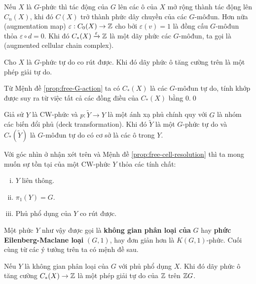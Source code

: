 Nếu $X$ là $G$-phức thì tác động của $G$ lên các ô của $X$ mở rộng thành tác động lên $C_n(X)$, khi đó $C(X)$ trở thành phức dây chuyền của các $G$-môđun. Hơn nữa  (augmentation map) $\varepsilon: C_0(X) \rightarrow \mathbb Z$ cho bởi $\varepsilon(v) = 1$ là đồng cấu $G$-môđun thỏa $\varepsilon \circ d = 0$. Khi đó $C_*(X) \xrightarrow{\varepsilon} \mathbb Z$ là một dãy phức các $G$-môđun, ta gọi là  (augmented
cellular chain complex).

\begin{proposition}\label{prop:free-cell-resolution}
    Cho $X$ là $G$-phức tự do co rút được. Khi đó dãy phức ô tăng cường trên là một phép giải tự do.
\end{proposition}
\startproof Từ Mệnh đề \ref{prop:free-G-action} ta có $C_*(X)$ là các $G$-môđun tự do, tính khớp được suy ra từ việc tất cả các đồng điều của $C_*(X)$ bằng $0$.\qed

\begin{remark}
    Giả sử $Y$ là CW-phức và $p: \tilde{Y} \rightarrow Y$ là một ánh xạ phủ chính quy với $G$ là nhóm các biến đổi phủ (deck transformation). Khi đó $\tilde{Y}$ là một $G$-phức tự do và $C_*(\tilde{Y})$ là $G$-môđun tự do có cơ sở là các ô trong $Y$.
\end{remark}

\begin{define}
    Với góc nhìn ở nhận xét trên và Mệnh đề \ref{prop:free-cell-resolution} thì ta mong muốn sự tồn tại của một CW-phức $Y$ thỏa các tính chất:
    \begin{enumerate}[(i)]
        \item $Y$ liên thông.
        \item $\pi_1(Y) = G$.
        \item Phủ phổ dụng của $Y$ co rút được.
    \end{enumerate}
    Một phức $Y$ như vậy được gọi là \textbf{không gian phân loại của} $G$ hay \textbf{phức Eilenberg-Maclane loại} $(G,1)$, hay đơn giản hơn là $K(G,1)$-phức. Cuối cùng từ các ý tưởng trên ta có mệnh đề sau.
\end{define}

\begin{proposition}
    Nếu $Y$ là không gian phân loại của $G$ với phủ phổ dụng $X$. Khi đó dãy phức ô tăng cường $C_*(X) \rightarrow \mathbb Z$ là một phép giải tự do của $\mathbb Z$ trên $\mathbb Z G$.
\end{proposition}

